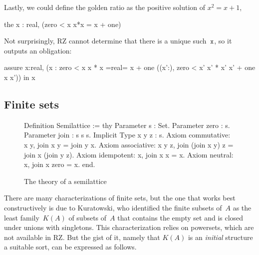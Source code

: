 Lastly, we could define the golden ratio as the positive solution of
$x^2 = x + 1$,
%
\begin{source}
the x : real, (zero < x \iAnd x*x = x + one)
\end{source}
%
Not surprisingly, RZ cannot determine that there is a unique such~$\mathtt{x}$,
so it outputs an obligation:
%
\begin{source}
assure x:real,
  (x :  \iAnd zero < x \iAnd x * x =real= x + one \iAnd
    (\iForall (x':),  zero < x' \iAnd x' * x'  x' + one \iTo x  x'))
  in x
\end{source}
\fi %

\iflong
\subsection{Finite sets}
\label{sec:finite-sets}

\begin{figure}[b]
\begin{source}
Definition Semilattice :=
thy
  Parameter s : Set.
  Parameter zero : s.
  Parameter join : s \iTo s \iTo s.
  Implicit Type x y z : s.
  Axiom commutative: \iForall x y,   join x y = join y x.
  Axiom associative: \iForall x y z, join (join x y) z = join x (join y z).
  Axiom idempotent:  \iForall x,     join x x = x.
  Axiom neutral:     \iForall x,     join x zero = x.
end.
\end{source}
\caption{The theory of a semilattice}
\label{fig:semilattice}
\end{figure}

\iflong
There are many characterizations of finite sets, but the one that
works best constructively is due to Kuratowski, who identified the
finite subsets of~$A$ as the least family~$K(A)$ of subsets of~$A$
that contains the empty set and is closed under unions with
singletons. This characterization relies on powersets, which are not
available in RZ. But the gist of it, namely that $K(A)$ is an
\emph{initial} structure a suitable sort, can be expressed as follows.

